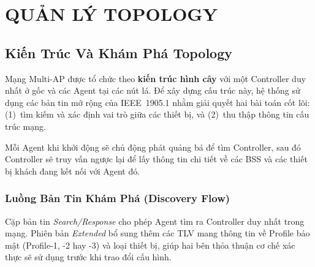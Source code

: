 \chapter{QUẢN LÝ TOPOLOGY}
\label{chapter:chapter-5}

\section{Kiến Trúc Và Khám Phá Topology}

Mạng Multi-AP được tổ chức theo \textbf{kiến trúc hình cây} với một Controller duy nhất
ở gốc và các Agent tại các nút lá. Để xây dựng cấu trúc này, hệ thống sử dụng các bản
tin mở rộng của IEEE~1905.1 nhằm giải quyết hai bài toán cốt lõi: (1)~tìm kiếm và xác
định vai trò giữa các thiết bị, và (2)~thu thập thông tin cấu trúc mạng.

Mỗi Agent khi khởi động sẽ chủ động phát quảng bá để tìm Controller, sau đó Controller
sẽ truy vấn ngược lại để lấy thông tin chi tiết về các BSS và các thiết bị khách đang
kết nối với Agent đó.


\subsection{Luồng Bản Tin Khám Phá (Discovery Flow)}

Cặp bản tin \textit{Search/Response} cho phép Agent tìm ra Controller duy nhất trong
mạng. Phiên bản \textit{Extended} bổ sung thêm các TLV mang thông tin về Profile bảo
mật (Profile-1, -2 hay -3) và loại thiết bị, giúp hai bên thỏa thuận cơ chế xác thực
sẽ sử dụng trước khi trao đổi cấu hình.

